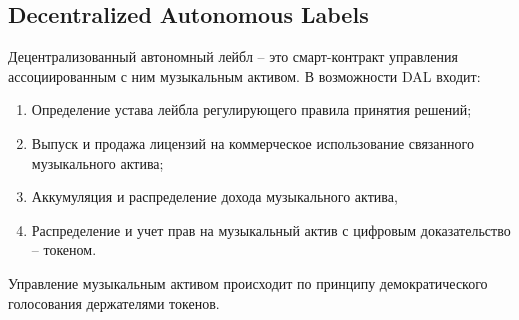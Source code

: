 \documentclass[12pt]{report}
\begin{document}
\subsection{Decentralized Autonomous Labels}
\label{tech-apps-dal}
\begin{multicols}{2}
Децентрализованный автономный лейбл – это смарт-контракт управления ассоциированным с ним музыкальным активом. В возможности DAL входит:
\begin{enumerate}
	\item Определение устава лейбла регулирующего правила принятия решений;
	\item Выпуск и продажа лицензий на коммерческое использование связанного музыкального актива;
	\item Аккумуляция и распределение дохода музыкального актива,
	\item Распределение и учет прав на музыкальный актив с цифровым доказательство – токеном.
\end{enumerate}

Управление музыкальным активом происходит по принципу демократического голосования держателями токенов. 


\end{multicols}
\end{document}
